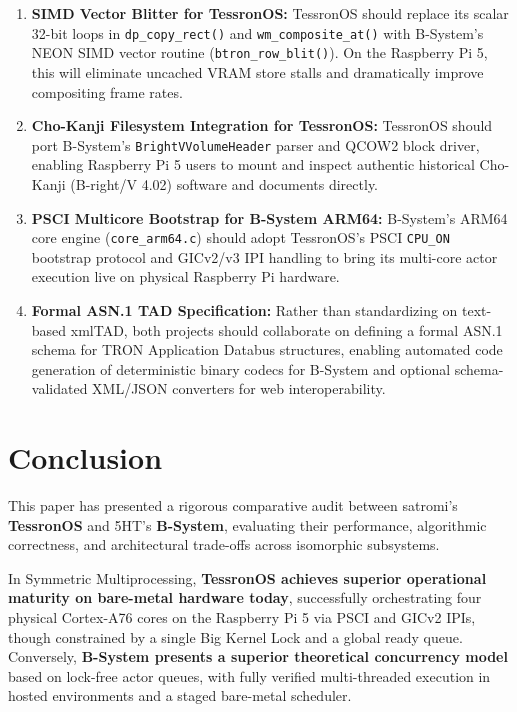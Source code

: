 \documentclass[10pt,journal,compsoc,twocolumn]{article}
\begin{document}
\begin{enumerate}[leftmargin=*]
    \item \textbf{SIMD Vector Blitter for TessronOS:} TessronOS should replace its scalar 32-bit loops in \texttt{dp\_copy\_rect()} and \texttt{wm\_composite\_at()} with B-System's NEON SIMD vector routine (\texttt{btron\_row\_blit()}). On the Raspberry Pi 5, this will eliminate uncached VRAM store stalls and dramatically improve compositing frame rates.
    \item \textbf{Cho-Kanji Filesystem Integration for TessronOS:} TessronOS should port B-System's \texttt{BrightVVolumeHeader} parser and QCOW2 block driver, enabling Raspberry Pi 5 users to mount and inspect authentic historical Cho-Kanji (B-right/V 4.02) software and documents directly.
    \item \textbf{PSCI Multicore Bootstrap for B-System ARM64:} B-System's ARM64 core engine (\texttt{core\_arm64.c}) should adopt TessronOS's PSCI \texttt{CPU\_ON} bootstrap protocol and GICv2/v3 IPI handling to bring its multi-core actor execution live on physical Raspberry Pi hardware.
    \item \textbf{Formal ASN.1 TAD Specification:} Rather than standardizing on text-based xmlTAD, both projects should collaborate on defining a formal ASN.1 schema for TRON Application Databus structures, enabling automated code generation of deterministic binary codecs for B-System and optional schema-validated XML/JSON converters for web interoperability.
\end{enumerate}

\section{Conclusion}
\label{sec:conclusion}

This paper has presented a rigorous comparative audit between satromi's \textbf{TessronOS} and 5HT's \textbf{B-System}, evaluating their performance, algorithmic correctness, and architectural trade-offs across isomorphic subsystems.

In Symmetric Multiprocessing, \textbf{TessronOS achieves superior operational maturity on bare-metal hardware today}, successfully orchestrating four physical Cortex-A76 cores on the Raspberry Pi 5 via PSCI and GICv2 IPIs, though constrained by a single Big Kernel Lock and a global ready queue. Conversely, \textbf{B-System presents a superior theoretical concurrency model} based on lock-free actor queues, with fully verified multi-threaded execution in hosted environments and a staged bare-metal scheduler.
\end{document}
